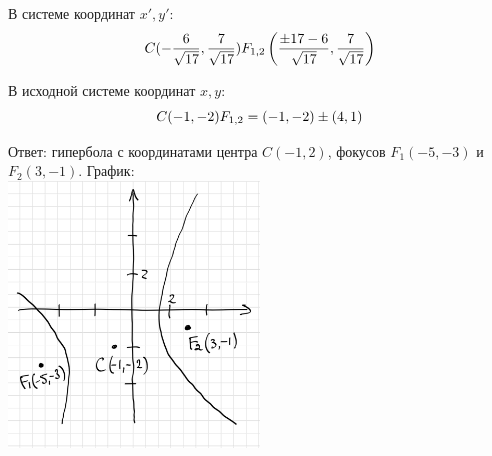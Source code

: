 \documentclass[12pt]{article}
\begin{document}
В системе координат $x', y'$:
\[
    C(-\dfrac{6}{\sqrt{17}}, \dfrac{7}{\sqrt{17}}) \\ F_{1,2}\left(\dfrac{\pm 17 - 6}{\sqrt{17}}, \dfrac{7}{\sqrt{17}}\right)
\]

В исходной системе координат $x, y$:
\[
    C(-1, -2) \\ F_{1,2} = (-1, -2) \pm (4, 1)
\]

\begin{framed}
    Ответ: гипербола с координатами центра $C(-1, 2)$, фокусов $F_1(-5, -3)$ и $F_2(3, -1)$. График:\\
    \includegraphics[width=0.5\textwidth]{./graphics/menshe.png}
\end{framed}
\end{document}
